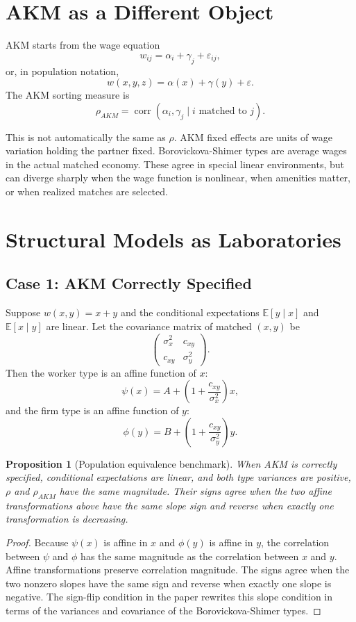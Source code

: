\documentclass[11pt]{article}
\newtheorem{proposition}{Proposition}
\newcommand{\E}{\mathbb{E}}
\newcommand{\corr}{\operatorname{corr}}
\begin{document}
\section{AKM as a Different Object}

AKM starts from the wage equation
\[
  w_{ij}=\alpha_i+\gamma_j+\varepsilon_{ij},
\]
or, in population notation,
\[
  w(x,y,z)=\alpha(x)+\gamma(y)+\varepsilon.
\]
The AKM sorting measure is
\[
  \rho_{AKM}
  =
  \corr(\alpha_i,\gamma_j\mid i\text{ matched to }j).
\]

This is not automatically the same as $\rho$. AKM fixed effects are units of wage variation holding the partner fixed. Borovickova-Shimer types are average wages in the actual matched economy. These agree in special linear environments, but can diverge sharply when the wage function is nonlinear, when amenities matter, or when realized matches are selected.

\section{Structural Models as Laboratories}

\subsection{Case 1: AKM Correctly Specified}

Suppose $w(x,y)=x+y$ and the conditional expectations $\E[y\mid x]$ and $\E[x\mid y]$ are linear. Let the covariance matrix of matched $(x,y)$ be
\[
  \begin{pmatrix}
  \sigma_x^2 & c_{xy}\\
  c_{xy} & \sigma_y^2
  \end{pmatrix}.
\]
Then the worker type is an affine function of $x$:
\[
  \psi(x)=A+\left(1+\frac{c_{xy}}{\sigma_x^2}\right)x,
\]
and the firm type is an affine function of $y$:
\[
  \phi(y)=B+\left(1+\frac{c_{xy}}{\sigma_y^2}\right)y.
\]

\begin{proposition}[Population equivalence benchmark]
When AKM is correctly specified, conditional expectations are linear, and
both type variances are positive, $\rho$ and $\rho_{AKM}$ have the same
magnitude. Their signs agree when the two affine transformations above have
the same slope sign and reverse when exactly one transformation is decreasing.
\end{proposition}

\begin{proof}
Because $\psi(x)$ is affine in $x$ and $\phi(y)$ is affine in $y$, the correlation between $\psi$ and $\phi$ has the same magnitude as the correlation between $x$ and $y$. Affine transformations preserve correlation magnitude. The signs agree when the two nonzero slopes have the same sign and reverse when exactly one slope is negative. The sign-flip condition in the paper rewrites this slope condition in terms of the variances and covariance of the Borovickova-Shimer types.
\end{proof}
\end{document}
